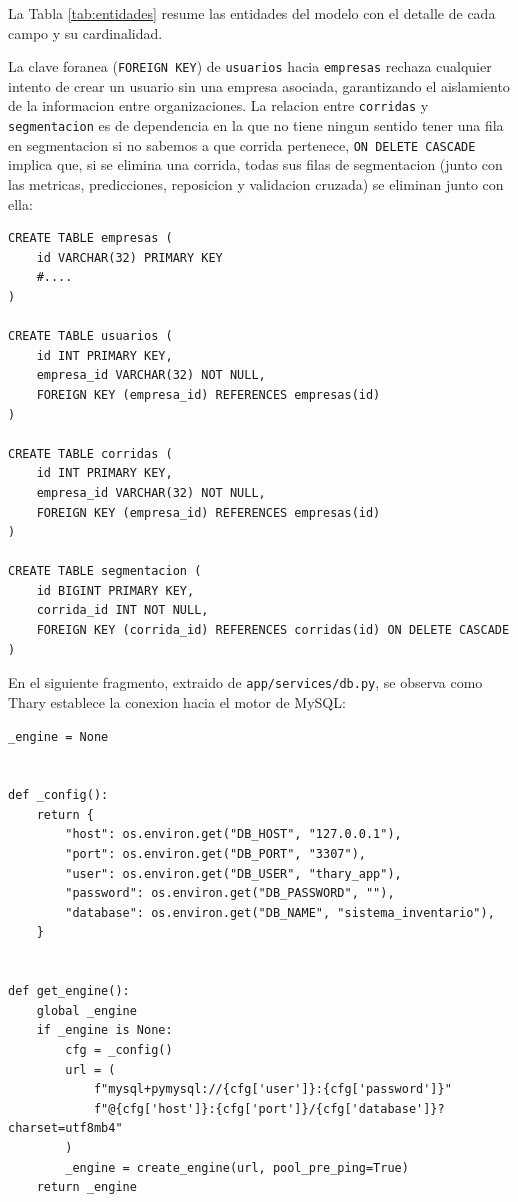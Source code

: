 La Tabla \ref{tab:entidades} resume las entidades del modelo con el detalle de cada campo y su cardinalidad.

La clave foranea (\texttt{FOREIGN KEY}) de \texttt{usuarios} hacia \texttt{empresas} rechaza cualquier intento de crear un usuario sin una empresa asociada, garantizando el aislamiento de la informacion entre organizaciones. La relacion entre \texttt{corridas} y \texttt{segmentacion} es de dependencia en la que no tiene ningun sentido tener una fila en segmentacion si no sabemos a que corrida pertenece, \texttt{ON DELETE CASCADE} implica que, si se elimina una corrida, todas sus filas de segmentacion (junto con las metricas, predicciones, reposicion y validacion cruzada) se eliminan junto con ella:

\label{lst:sql_tablas}
\begin{verbatim}
CREATE TABLE empresas (
    id VARCHAR(32) PRIMARY KEY
    #....
)

CREATE TABLE usuarios (
    id INT PRIMARY KEY,
    empresa_id VARCHAR(32) NOT NULL,
    FOREIGN KEY (empresa_id) REFERENCES empresas(id)
)

CREATE TABLE corridas (
    id INT PRIMARY KEY,
    empresa_id VARCHAR(32) NOT NULL,
    FOREIGN KEY (empresa_id) REFERENCES empresas(id)
)

CREATE TABLE segmentacion (
    id BIGINT PRIMARY KEY,
    corrida_id INT NOT NULL,
    FOREIGN KEY (corrida_id) REFERENCES corridas(id) ON DELETE CASCADE
)
\end{verbatim}

En el siguiente fragmento, extraido de \texttt{app/services/db.py}, se observa como Thary establece la conexion hacia el motor de MySQL:

\label{lst:conexion_mysql}
\begin{verbatim}
_engine = None


def _config():
    return {
        "host": os.environ.get("DB_HOST", "127.0.0.1"),
        "port": os.environ.get("DB_PORT", "3307"),
        "user": os.environ.get("DB_USER", "thary_app"),
        "password": os.environ.get("DB_PASSWORD", ""),
        "database": os.environ.get("DB_NAME", "sistema_inventario"),
    }


def get_engine():
    global _engine
    if _engine is None:
        cfg = _config()
        url = (
            f"mysql+pymysql://{cfg['user']}:{cfg['password']}"
            f"@{cfg['host']}:{cfg['port']}/{cfg['database']}?charset=utf8mb4"
        )
        _engine = create_engine(url, pool_pre_ping=True)
    return _engine
\end{verbatim}

